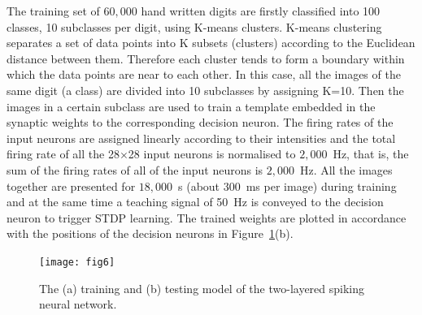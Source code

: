 \documentclass{frontiersENG} %
\begin{document}
The training set of $60,000$ hand written digits are firstly classified into 100 classes, 10 subclasses per digit, using K-means clusters.
K-means clustering separates a set of data points into K subsets (clusters) according to the Euclidean distance between them.
Therefore each cluster tends to form a boundary within which the data points are near to each other.
In this case, all the images of the same digit (a class) are divided into 10 subclasses by assigning K=10.
Then the images in a certain subclass are used to train a template embedded in the synaptic weights to the corresponding decision neuron.
The firing rates of the input neurons are assigned linearly according to their intensities and the total firing rate of all the 28$\times$28 input neurons is normalised to $2,000$~Hz, that is, the sum of the firing rates of all of the input neurons is $2,000$~Hz.
All the images together are presented for $18,000$~s (about 300~ms per image) during training and at the same time a teaching signal of 50~Hz is conveyed to the decision neuron to trigger STDP learning.
The trained weights are plotted in accordance with the positions of the decision neurons in Figure~\ref{fig:model}(b).

\begin{figure}[thb!]
	\centering
%	
%	
	\texttt{[image: fig6]}
	\caption{The (a) training and (b) testing model of the two-layered spiking neural network.}
	\label{fig:model}
\end{figure} 
\end{document}
